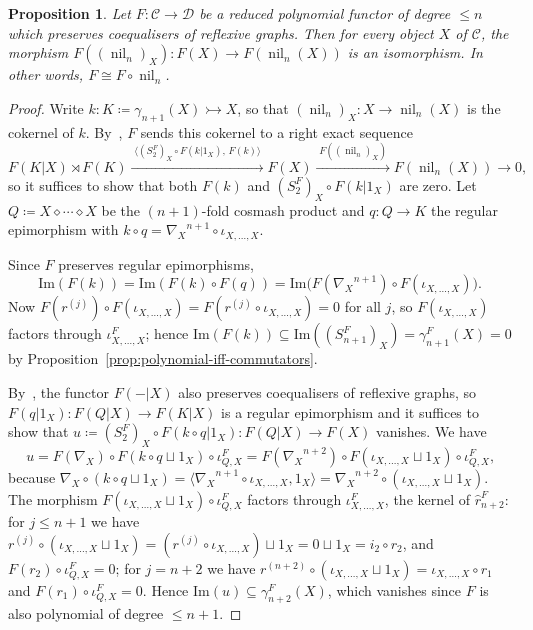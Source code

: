 \documentclass[reqno,a4paper]{amsart}
\theoremstyle{plain}
\newtheorem{proposition}[subsection]{Proposition}
\theoremstyle{definition}
\newcommand{\DefEq}{\coloneq}
\newcommand{\C}{\ensuremath{\mathcal{C}}}
\newcommand{\D}{\ensuremath{\mathcal{D}}}
\DeclareMathOperator{\nil}{nil}
\renewcommand{\Im}{\ensuremath{\mathrm{Im}}}
\newcommand{\cosmash}{\ensuremath{\diamond}}
\newcommand{\cosum}{\ensuremath{\sqcup}}                   %
\newcommand{\cmF}[2]{\ensuremath{\hat{r}^{#1}_{#2}}}       %
\newcommand{\fold}[1]{\ensuremath{\nabla_{#1}}}            %
\begin{document}
\begin{proposition}\label{prop:F-nil}
  Let \(F\colon \C\to\D\) be a reduced polynomial functor of degree \(\leq n\) which preserves coequalisers of reflexive graphs. Then for every object \(X\) of \(\C\), the morphism \(F((\nil_{n})_{X})\colon F(X)\to F(\nil_{n}(X))\) is an isomorphism. In other words, \(F\cong F\circ\nil_{n}\).
\end{proposition}

\begin{proof}
  Write \(k\colon K\DefEq\gamma_{n+1}(X)\rightarrowtail X\), so that \((\nil_{n})_{X}\colon X\to\nil_{n}(X)\) is the cokernel of \(k\). By~\cite[Proposition~9.8]{DHVdL}, \(F\) sends this cokernel to a right exact sequence
  \[
    F(K|X)\rtimes F(K)\xrightarrow{\;\langle (S^{F}_{2})_{X}\circ F(k|1_{X}),\,F(k)\rangle\;}F(X)\xrightarrow{\;F((\nil_{n})_{X})\;}F(\nil_{n}(X))\to 0\text{,}
  \]
  so it suffices to show that both \(F(k)\) and \((S^{F}_{2})_{X}\circ F(k|1_{X})\) are zero. Let \(Q\DefEq X\cosmash\cdots\cosmash X\) be the \((n+1)\)-fold cosmash product and \(q\colon Q\to K\) the regular epimorphism with \(k\circ q=\fold{X}^{n+1}\circ\iota_{X,\dots,X}\).

  Since \(F\) preserves regular epimorphisms,
  \[
    \Im(F(k))=\Im(F(k)\circ F(q))=\Im\bigl(F(\fold{X}^{n+1})\circ F(\iota_{X,\dots,X})\bigr)\text{.}
  \]
  Now \(F(r^{(j)})\circ F(\iota_{X,\dots,X})=F(r^{(j)}\circ\iota_{X,\dots,X})=0\) for all \(j\), so \(F(\iota_{X,\dots,X})\) factors through \(\iota^{F}_{X,\dots,X}\); hence \(\Im(F(k))\subseteq\Im((S^{F}_{n+1})_{X})=\gamma^{F}_{n+1}(X)=0\) by Proposition~\ref{prop:polynomial-iff-commutators}.

  By~\cite[Theorem~9.5]{DHVdL}, the functor \(F(-|X)\) also preserves coequalisers of reflexive graphs, so \(F(q|1_{X})\colon F(Q|X)\to F(K|X)\) is a regular epimorphism and it suffices to show that \(u\DefEq(S^{F}_{2})_{X}\circ F(k\circ q|1_{X})\colon F(Q|X)\to F(X)\) vanishes. We have
  \[
    u=F(\fold{X})\circ F(k\circ q\cosum 1_{X})\circ\iota^{F}_{Q,X}=F(\fold{X}^{n+2})\circ F(\iota_{X,\dots,X}\cosum 1_{X})\circ\iota^{F}_{Q,X}\text{,}
  \]
  because \(\fold{X}\circ(k\circ q\cosum 1_{X})=\langle\fold{X}^{n+1}\circ\iota_{X,\dots,X},1_{X}\rangle=\fold{X}^{n+2}\circ(\iota_{X,\dots,X}\cosum 1_{X})\). The morphism \(F(\iota_{X,\dots,X}\cosum 1_{X})\circ\iota^{F}_{Q,X}\) factors through \(\iota^{F}_{X,\dots,X}\), the kernel of \(\cmF{F}{n+2}\): for \(j\leq n+1\) we have \(r^{(j)}\circ(\iota_{X,\dots,X}\cosum 1_{X})=(r^{(j)}\circ\iota_{X,\dots,X})\cosum 1_{X}=0\cosum 1_{X}=i_{2}\circ r_{2}\), and \(F(r_{2})\circ\iota^{F}_{Q,X}=0\); for \(j=n+2\) we have \(r^{(n+2)}\circ(\iota_{X,\dots,X}\cosum 1_{X})=\iota_{X,\dots,X}\circ r_{1}\) and \(F(r_{1})\circ\iota^{F}_{Q,X}=0\). Hence \(\Im(u)\subseteq\gamma^{F}_{n+2}(X)\), which vanishes since \(F\) is also polynomial of degree \(\leq n+1\).
\end{proof}
\end{document}
